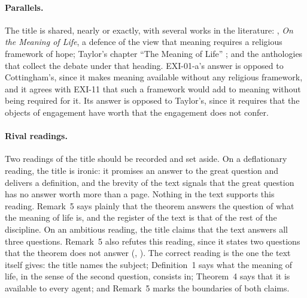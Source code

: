 \paragraph{Parallels.} The title is shared, nearly or exactly, with several works in the literature: \citet{Cottingham2003}, \emph{On the Meaning of Life}, a defence of the view that meaning requires a religious framework of hope; Taylor's chapter \enquote{The Meaning of Life} \citep[ch.~18]{Taylor1970}; and the anthologies that collect the debate under that heading. EXI-01-a's answer is opposed to Cottingham's, since it makes meaning available without any religious framework, and it agrees with EXI-11 that such a framework would add to meaning without being required for it. Its answer is opposed to Taylor's, since it requires that the objects of engagement have worth that the engagement does not confer.

\paragraph{Rival readings.} Two readings of the title should be recorded and set aside. On a deflationary reading, the title is ironic: it promises an answer to the great question and delivers a definition, and the brevity of the text signals that the great question has no answer worth more than a page. Nothing in the text supports this reading. Remark~5 says plainly that the theorem answers the question of what the meaning of life is, and the register of the text is that of the rest of the discipline. On an ambitious reading, the title claims that the text answers all three questions. Remark~5 also refutes this reading, since it states two questions that the theorem does not answer (, ). The correct reading is the one the text itself gives: the title names the subject; Definition~1 says what the meaning of life, in the sense of the second question, consists in; Theorem~4 says that it is available to every agent; and Remark~5 marks the boundaries of both claims.
